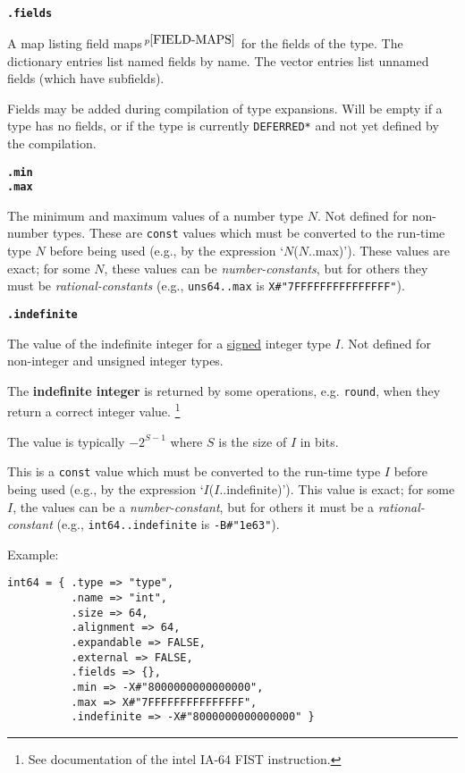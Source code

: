 \documentclass[12pt]{article}
\newcommand{\key}[1]{{\rm \bfseries #1}}
\newcommand{\ttkey}[1]{{\tt \bfseries #1}}
\newcommand{\pagnote}[1]{$\,^{p\pageref{#1}}$}
\newenvironment{indpar}[1][0.3in]%
	{\begin{list}{}%
		     {\setlength{\itemsep}{0in}%
		      \setlength{\topsep}{0in}%
		      \setlength{\parsep}{1ex}%
		      \setlength{\labelwidth}{#1}%
		      \setlength{\leftmargin}{#1}%
		      \addtolength{\leftmargin}{\labelsep}}%
	 \item}%
	{\end{list}}
\begin{document}
\ttkey{.fields}
\begin{indpar}
A map listing field maps\pagnote{FIELD-MAPS} for the fields of the type.
The dictionary entries list named fields by name.
The vector entries list unnamed fields
(which have subfields).

Fields may be added during compilation of type expansions.
Will be empty if a type has no fields, or if the type is
currently {\tt *DEFERRED*} and not yet defined by the
compilation.
\end{indpar}

\ttkey{.min} \\
\ttkey{.max}
\begin{indpar}
The minimum and maximum values of a number type $N$.  Not defined for
non-number types.  These are {\tt const} values which must be
converted to the run-time type $N$ before being used
(e.g., by the expression `$N$($N$..max)').  These values are exact;
for some $N$, these values can be {\em number-constants}, but
for others they must be {\em rational-constants}
(e.g., {\tt uns64..max} is {\tt X\#"7FFFFFFFFFFFFFFF"}).
\end{indpar}

\ttkey{.indefinite}
\begin{indpar}
The value of the indefinite integer for a \underline{signed} integer type $I$.
Not defined for non-integer and unsigned integer types.

The \key{indefinite integer}\label{INDEFINITE-INTEGER} is returned by
some operations, e.g. {\tt round},
when they return a correct integer value.%
\footnote{See documentation of the intel IA-64 FIST instruction.}

The value is typically $-2^{S-1}$ where $S$ is the size of $I$ in bits.

This is a {\tt const} value which must be
converted to the run-time type $I$ before being used
(e.g., by the expression `$I$($I$..indefinite)').  This value is exact;
for some $I$, the values can be a {\em number-constant}, but
for others it must be a {\em rational-constant}
(e.g., {\tt int64..indefinite} is {\tt -B\#"1e63"}).
\end{indpar}

Example:
\begin{indpar}\begin{verbatim}
int64 = { .type => "type",
          .name => "int",
          .size => 64,
          .alignment => 64,
          .expandable => FALSE,
          .external => FALSE,
          .fields => {},
          .min => -X#"8000000000000000",
          .max => X#"7FFFFFFFFFFFFFFF",
          .indefinite => -X#"8000000000000000" }
\end{verbatim}\end{indpar}
\end{document}
